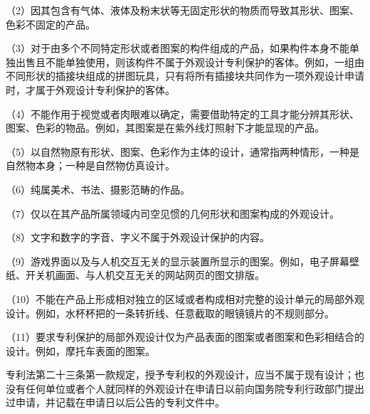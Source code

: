 {\setlength{\parindent}{17.1bp}（2）因其包含有气体、液体及粉末状等无固定形状的物质而导致其形状、图案、色彩不固定的产品。\par}

{\setlength{\parindent}{17.1bp}（3）对于由多个不同特定形状或者图案的构件组成的产品，如果构件本身不能单独出售且不能单独使用，则该构件不属于外观设计专利保护的客体。例如，一组由不同形状的插接块组成的拼图玩具，只有将所有插接块共同作为一项外观设计申请时，才属于外观设计专利保护的客体。\par}

{\setlength{\parindent}{17.1bp}（4）不能作用于视觉或者肉眼难以确定，需要借助特定的工具才能分辨其形状、图案、色彩的物品。例如，其图案是在紫外线灯照射下才能显现的产品。\par}

{\setlength{\parindent}{17.1bp}（5）以自然物原有形状、图案、色彩作为主体的设计，通常指两种情形，一种是自然物本身；一种是自然物仿真设计。\par}

{\setlength{\parindent}{17.1bp}（6）纯属美术、书法、摄影范畴的作品。\par}

{\setlength{\parindent}{17.1bp}（7）仅以在其产品所属领域内司空见惯的几何形状和图案构成的外观设计。\par}

{\setlength{\parindent}{17.1bp}（8）文字和数字的字音、字义不属于外观设计保护的内容。\par}

{\setlength{\parindent}{17.1bp}（9）游戏界面以及与人机交互无关的显示装置所显示的图案。例如，电子屏幕壁纸、开关机画面、与人机交互无关的网站网页的图文排版。\par}

{\setlength{\parindent}{17.1bp}（10）不能在产品上形成相对独立的区域或者构成相对完整的设计单元的局部外观设计。例如，水杯杯把的一条转折线、任意截取的眼镜镜片的不规则部分。\par}

{\setlength{\parindent}{17.1bp}（11）要求专利保护的局部外观设计仅为产品表面的图案或者图案和色彩相结合的设计。例如，摩托车表面的图案。\par}

专利法第二十三条第一款规定，授予专利权的外观设计，应当不属于现有设计；也没有任何单位或者个人就同样的外观设计在申请日以前向国务院专利行政部门提出过申请，并记载在申请日以后公告的专利文件中。

